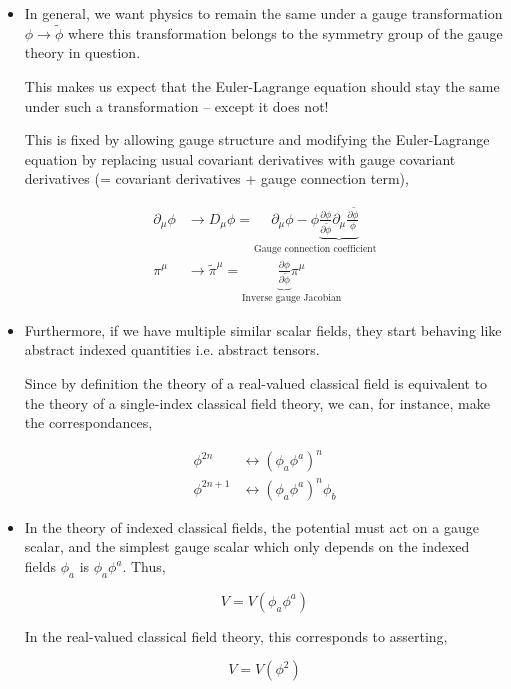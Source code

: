 \documentclass{beamer}
\begin{document}
\begin{frame}
\begin{itemize}
\item In general, we want physics to remain the same under a gauge transformation $\phi \to \widetilde{\phi}$ where this transformation belongs to the symmetry group of the gauge theory in question.

This makes us expect that the Euler-Lagrange equation should stay the same under such a transformation -- except it does not! 

This is fixed by allowing gauge structure and modifying the Euler-Lagrange equation by replacing usual covariant derivatives with gauge covariant derivatives (= covariant derivatives + gauge connection term),

\begin{align*}
\partial_\mu \phi & \to D_\mu \phi = \underset{\text{Gauge connection coefficient}}{\partial_\mu \phi - \phi \underbrace{\frac{\partial \phi}{\partial \widetilde{\phi}} \partial_\mu \frac{\partial \widetilde{\phi}}{\phi}}} \\
\pi^\mu & \to \widetilde{\pi}^\mu = \underset{\text{Inverse gauge Jacobian}}{\underbrace{\frac{\partial \phi}{\partial \widetilde{\phi}}} \pi^\mu}
\end{align*}
\end{itemize}
\end{frame}

\begin{frame}
\begin{itemize}
\item Furthermore, if we have multiple similar scalar fields, they start behaving like abstract indexed quantities i.e. abstract tensors.

Since by definition the theory of a real-valued classical field is equivalent to the theory of a single-index classical field theory, we can, for instance, make the correspondances,

\begin{align*}
\phi^{2n} & \leftrightarrow \left( \phi_a \phi^a \right)^n \\
\phi^{2n+1} & \leftrightarrow \left( \phi_a \phi^a \right)^n \phi_b
\end{align*}

\item In the theory of indexed classical fields, the potential must act on a gauge scalar, and the simplest gauge scalar which only depends on the indexed fields $\phi_a$ is $\phi_a \phi^a$. Thus,

$$V = V \left( \phi_a \phi^a \right)$$

In the real-valued classical field theory, this corresponds to asserting,

$$V = V \left( \phi^2 \right)$$
\end{itemize}
\end{frame}
\end{document}
